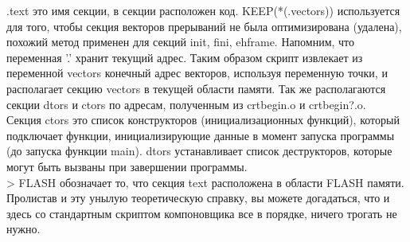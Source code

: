 \documentclass[12pt,a4paper]{article}
\begin{document}
    .text это имя секции, в секции расположен код. KEEP(*(.vectors)) используется
    для того, чтобы секция векторов прерываний не была оптимизирована (удалена),
    похожий метод применен для секций init, fini, eh\textunderscore frame. Напомним, что переменная
    '.' хранит текущий адрес. Таким образом скрипт извлекает из переменной vectors
    конечный адрес векторов, используя переменную точки, и располагает секцию
    vectors в текущей области памяти.
    Так же располагаются секции dtors и ctors по адресам,
    полученным из crtbegin.o и crtbegin?.o.\\
    Секция ctors это список конструкторов (инициализационных функций),
    который подключает функции, инициализирующие данные в момент запуска программы
    (до запуска функции main).
    dtors устанавливает список деструкторов, которые могут быть вызваны при
    завершении программы.\\
    > FLASH обозначает то, что секция text расположена в области FLASH памяти.\\
    Пролистав и эту унылую теоретическую справку, вы можете догадаться,
    что и здесь со стандартным скриптом компоновщика все в порядке,
    ничего трогать не нужно.
\end{document}
